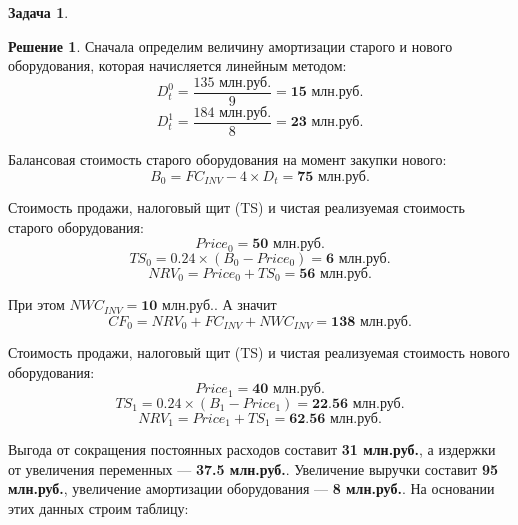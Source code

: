\documentclass[a4paper, 14pt]{article}
\theoremstyle{plain} %
\theoremstyle{definition} %
\newtheorem*{solution}{Решение}
\newtheorem{problem}{Задача}[subsection]
\theoremstyle{remark} %
\begin{document}
\begin{problem}
    \begin{solution}
		Сначала определим величину амортизации старого и нового оборудования, которая начисляется линейным методом:
		\[D_{t}^{0} = \frac{\text{135 млн.руб.}}{9} = \textbf{15 млн.руб.}\]
		\[D_{t}^{1} = \frac{\text{184 млн.руб.}}{8} = \textbf{23 млн.руб.}\]

		Балансовая стоимость старого оборудования на момент закупки нового:
		\[B_{0} = FC_{INV} - 4 \times D_{t} = \textbf{75 млн.руб.}\]

		Стоимость продажи, налоговый щит (TS) и чистая реализуемая стоимость старого оборудования:
		\[Price_{0} = \textbf{50 млн.руб.}\]
		\[TS_{0} = 0.24\times(B_{0} - Price_{0}) = \textbf{6 млн.руб.}\]
		\[NRV_{0} = Price_{0} + TS_{0} = \textbf{56 млн.руб.}\]

		При этом $NWC_{INV} = \textbf{10 млн.руб.}$.
		А значит
		\[CF_{0} = NRV_{0} + FC_{INV} + NWC_{INV} = \textbf{138 млн.руб.}\]

		Стоимость продажи, налоговый щит (TS) и чистая реализуемая стоимость нового оборудования:
		\[Price_{1} = \textbf{40 млн.руб.}\]
		\[TS_{1} = 0.24\times(B_{1} - Price_{1}) = \textbf{22.56 млн.руб.}\]
		\[NRV_{1} = Price_{1} + TS_{1} = \textbf{62.56 млн.руб.}\]

		Выгода от сокращения постоянных расходов составит \textbf{31 млн.руб.}, а издержки от увеличения переменных --- \textbf{37.5 млн.руб.}. Увеличение выручки составит \textbf{95 млн.руб.}, увеличение амортизации оборудования --- \textbf{8 млн.руб.}.
		На основании этих данных строим таблицу:


\end{solution}
\end{problem}
\end{document}
